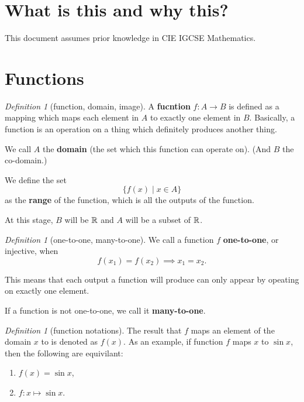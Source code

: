\documentclass[8pt]{article}
\author{\Author}
\title{\Title}
\date{Version 1. \Date}
\theoremstyle{remark}
\newtheorem{definition}[theorem]{Definition}
\begin{document}
	\maketitle

	\tableofcontents

    \section*{What is this and why this?}

        This document assumes prior knowledge in CIE IGCSE Mathematics.
    
    \section{Functions}

        \begin{definition}[function, domain, image]
            A \textbf{fucntion} $f: A \rightarrow B$ is defined as a mapping which maps each element in $A$ to exactly one element in $B$. Basically, a function is an operation on a thing which definitely produces another thing.

            We call $A$ the \textbf{domain} (the set which this function can operate on). (And $B$ the co-domain.)

            We define the set
            $$
                \{f(x) \mid x \in A\}
            $$
            as the \textbf{range} of the function, which is all the outputs of the function.

            At this stage, $B$ will be $\mathbb{R}$ and $A$ will be a subset of $\mathbb{R}$.
        \end{definition}

        \begin{definition}[one-to-one, many-to-one]
            We call a function $f$ \textbf{one-to-one}, or injective, when
            $$
                f(x_1) = f(x_2) \implies x_1 = x_2.
            $$
            
            This means that each output a function will produce can only appear by opeating on exactly one element.

            If a function is not one-to-one, we call it \textbf{many-to-one}.
        \end{definition}

        \begin{definition}[function notations]
            The result that $f$ maps an element of the domain $x$ to is denoted as $f(x)$. As an example, if function $f$ maps $x$ to $\sin x$, then the following are equivilant:
            \begin{enumerate}
                \item $f(x) = \sin x$,
                \item $f: x \mapsto \sin x$.
            \end{enumerate}
        \end{definition}
\end{document}
